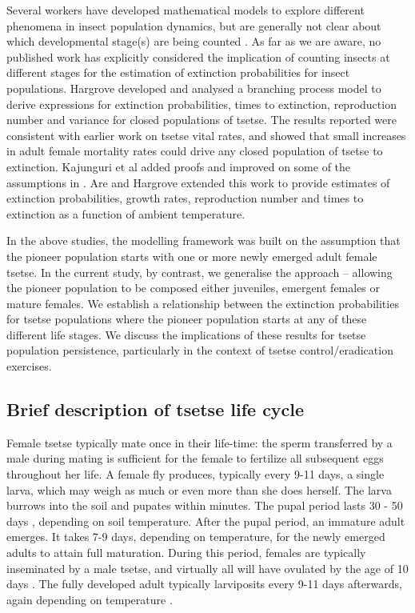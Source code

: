 \documentclass[smallextended]{svjour3}
\begin{document}
Several workers have developed mathematical models to explore different phenomena in insect population dynamics, but are generally not clear about which developmental stage(s) are being counted \cite{Ylioja1999,Artzrouni2003,Hargrove2005a,Adams2005,Barclay2011d,Peck2012a,Lin2015,Kajunguri2019}.  As far as we are aware, no published work has explicitly considered the implication of counting insects at different stages for the estimation of extinction probabilities for insect populations. Hargrove \cite{Hargrove2005a} developed and analysed a branching process model to derive expressions for extinction probabilities, times to extinction, reproduction number and variance for closed populations of tsetse. The results reported were consistent with earlier work \cite{hargrove1988tsetse} on tsetse vital rates, and showed that small increases in adult female mortality rates could drive any closed population of tsetse to extinction. Kajunguri et al \cite{Kajunguri2019} added proofs and improved on some of the assumptions in \cite{Hargrove2005a}. Are and Hargrove \cite{Are2019} extended this work to provide estimates of extinction probabilities, growth rates, reproduction number and times to extinction as a function of ambient temperature. 

In the above studies, the modelling framework was built on the assumption that the pioneer population starts with one or more newly emerged adult female tsetse. In the current study, by contrast, we  generalise the approach – allowing the pioneer population to be composed  either juveniles, emergent females or mature females. We establish a relationship between the extinction probabilities for tsetse populations where the pioneer population starts at any of these different life stages. We discuss the implications of these results for tsetse population persistence, particularly in the context of tsetse control/eradication exercises. 

\subsection{Brief description of tsetse life cycle}
Female tsetse typically mate once in their life-time: the sperm transferred by a male during mating is sufficient for the female to fertilize all subsequent eggs throughout her life. A female fly produces, typically every 9-11 days, a single larva, which may weigh as much or even more than she does herself.  The larva burrows into the soil and pupates within minutes. The pupal period lasts 30 - 50 days \cite{PhelpsR.J.&Burrows}, depending on soil temperature. After the pupal period, an immature adult emerges. It takes 7-9 days, depending on temperature, for the newly emerged adults to attain full maturation. During this period, females are typically inseminated by a male tsetse, and virtually all will have ovulated by the age of 10 days \cite{Hargrove2012c}. The fully developed adult typically larviposits every 9-11 days afterwards, again depending on temperature \cite{Hargrove2019}. 
\end{document}
